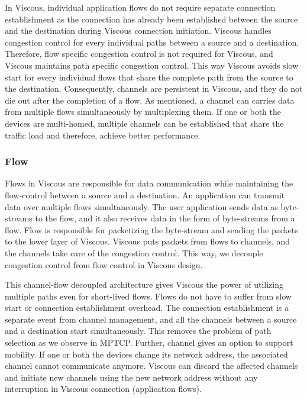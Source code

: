 In Viscous, individual application flows do not require separate connection establishment as the connection has already been established between the source and the destination during Viscous connection initiation. Viscous handles congestion control for every individual paths between a source and a destination. Therefore, flow specific congestion control is not required for Viscous, and Viscous maintains path specific congestion control. This way Viscous avoids slow start for every individual flows that share the complete path from the source to the destination. Consequently, channels are persistent in Viscous, and they do not die out after the completion of a flow. As mentioned, a channel can carries data from multiple flows simultaneously by multiplexing them. If one or both the devices are multi-homed, multiple channels can be established that share the traffic load and therefore, achieve better performance.

\subsubsection{Flow} 
Flows in Viscous are responsible for data communication while maintaining the flow-control between a source and a destination. An application can transmit data over multiple flows simultaneously. The user application sends data as byte-streams to the flow, and it also receives data in the form of byte-streams from a flow. Flow is responsible for packetizing the byte-stream and sending the packets to the lower layer of Viscous. Viscous puts packets from flows to channels, and the channels take care of the congestion control. This way, we decouple congestion control from flow control in Viscous design. 

This channel-flow decoupled architecture gives Viscous the power of utilizing multiple paths even for short-lived flows. Flows do not have to suffer from slow start or connection establishment overhead. The connection establishment is a separate event from channel management, and all the channels between a source and a destination start simultaneously. This removes the problem of path selection as we observe in MPTCP.  Further, channel gives an option to support mobility. If one or both the devices change its network address, the associated channel cannot communicate anymore. Viscous can discard the affected channels and initiate new channels using the new network address without any interruption in Viscous connection (application flows). 


